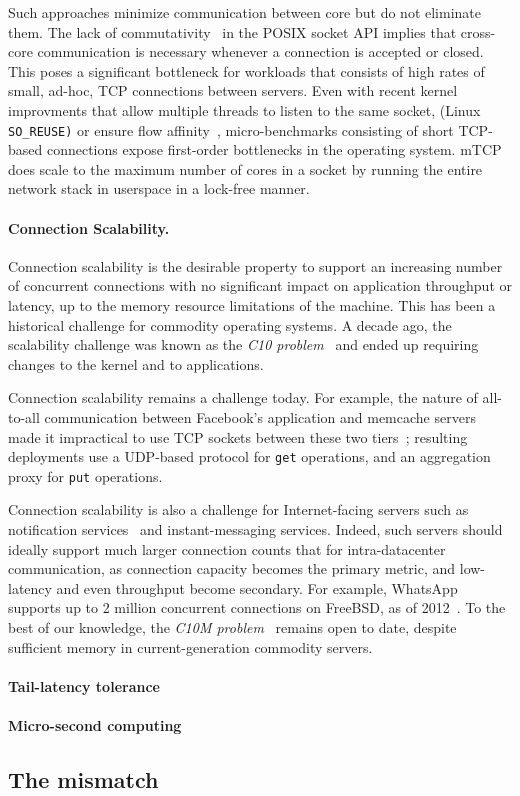 Such approaches minimize communication between core but do not
eliminate them.  The lack of
commutativity~\cite{DBLP:conf/sosp/ClementsKZMK13} in the POSIX socket
API implies that cross-core communication is necessary whenever a
connection is accepted or closed.  This poses a significant bottleneck
for workloads that consists of high rates of small, ad-hoc, TCP
connections between servers.  Even with recent kernel improvments that
allow multiple threads to listen to the same socket, (Linux
\texttt{SO\_REUSE)} or ensure flow
affinity~\cite{DBLP:conf/eurosys/PesterevSZM12}, micro-benchmarks
consisting of short TCP-based connections expose first-order
bottlenecks in the operating system.  mTCP~\cite{jeong2014mtcp} does
scale to the maximum number of cores in a socket by running the entire
network stack in userspace in a lock-free manner.


\paragraph{Connection Scalability.}

Connection scalability is the desirable property to support an
increasing number of concurrent connections with no significant impact
on application throughput or latency, up to the memory resource
limitations of the machine.  This has been a historical challenge for
commodity operating systems.  A decade ago, the scalability challenge
was known as the \emph{C10 problem}~\cite{} and ended up requiring changes to
the kernel and to applications.   

Connection scalability remains a challenge today.  For example, the
nature of all-to-all communication between Facebook's application and
memcache servers made it impractical to use TCP sockets between these
two tiers~\cite{nishtala2013scaling}; resulting deployments use a
UDP-based protocol for \texttt{get} operations, and an aggregation
proxy for \texttt{put} operations.

Connection scalability is also a challenge for Internet-facing servers
such as notification services~\cite{DBLP:conf/sosp/AdyaCMP11} and
instant-messaging services.  Indeed, such servers should ideally
support much larger connection counts that for intra-datacenter
communication, as connection capacity becomes the primary metric, and
low-latency and even throughput become secondary.  For example,
WhatsApp supports up to 2 million concurrent connections on FreeBSD, as
of 2012~\cite{whatsapp-2mil}.  To the best of our knowledge, the
\emph{C10M problem}~\cite{theC10mproblem} remains open to date,
despite sufficient memory in current-generation commodity servers.

\paragraph{Tail-latency tolerance}


\paragraph{Micro-second computing}

\subsection{The mismatch}






